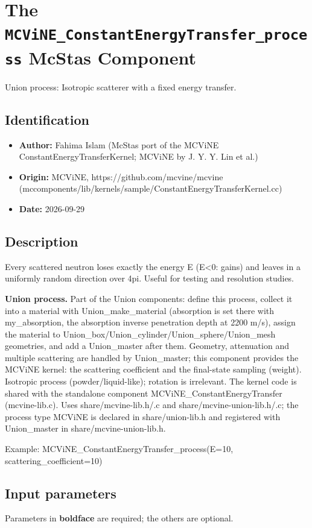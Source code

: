 \section{The \texttt{MCViNE\_ConstantEnergyTransfer\_process} McStas Component}
Union process: Isotropic scatterer with a fixed energy transfer.

\subsection*{Identification}
\begin{itemize}
  \item \textbf{Author:} Fahima Islam (McStas port of the MCViNE ConstantEnergyTransferKernel; MCViNE by J. Y. Y. Lin et al.)
  \item \textbf{Origin:} MCViNE, https://github.com/mcvine/mcvine (mccomponents/lib/kernels/sample/ConstantEnergyTransferKernel.cc)
  \item \textbf{Date:} 2026-09-29
\end{itemize}

\subsection*{Description}
Every scattered neutron loses exactly the energy E (E\textless{}0: gains) and leaves in a uniformly random direction over 4pi. Useful for testing and resolution studies.

\textbf{Union process.} Part of the Union components: define this process, collect it into a material with Union\_make\_material (absorption is set there with my\_absorption, the absorption inverse penetration depth at 2200 m/s), assign the material to Union\_box/Union\_cylinder/Union\_sphere/Union\_mesh geometries, and add a Union\_master after them. Geometry, attenuation and multiple scattering are handled by Union\_master; this component provides the MCViNE kernel: the scattering coefficient and the final-state sampling (weight). Isotropic process (powder/liquid-like); rotation is irrelevant. The kernel code is shared with the standalone component MCViNE\_ConstantEnergyTransfer (mcvine-lib.c). Uses share/mcvine-lib.h/.c and share/mcvine-union-lib.h/.c; the process type MCViNE is declared in share/union-lib.h and registered with Union\_master in share/mcvine-union-lib.h.

Example: MCViNE\_ConstantEnergyTransfer\_process(E=10, scattering\_coefficient=10)

\subsection*{Input parameters}
Parameters in \textbf{boldface} are required; the others are optional.

